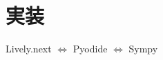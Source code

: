 \chapter{実装}

Lively.next\cite{Lively.next}
$\Leftrightarrow$
Pyodide\cite{Pyodide}
$\Leftrightarrow$
Sympy\cite{SymPy}


